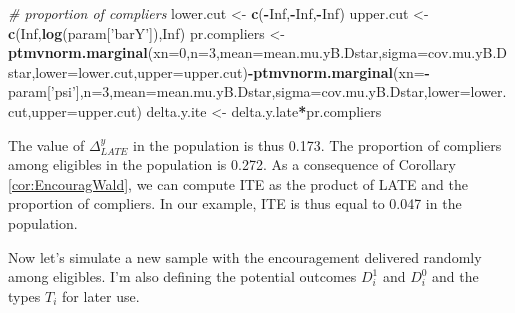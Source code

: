 \documentclass[]{book}
\newenvironment{Shaded}{\begin{snugshade}}{\end{snugshade}}
\newcommand{\CommentTok}[1]{\textcolor[rgb]{0.56,0.35,0.01}{\textit{#1}}}
\newcommand{\DataTypeTok}[1]{\textcolor[rgb]{0.13,0.29,0.53}{#1}}
\newcommand{\DecValTok}[1]{\textcolor[rgb]{0.00,0.00,0.81}{#1}}
\newcommand{\KeywordTok}[1]{\textcolor[rgb]{0.13,0.29,0.53}{\textbf{#1}}}
\newcommand{\NormalTok}[1]{#1}
\newcommand{\OperatorTok}[1]{\textcolor[rgb]{0.81,0.36,0.00}{\textbf{#1}}}
\newcommand{\OtherTok}[1]{\textcolor[rgb]{0.56,0.35,0.01}{#1}}
\newcommand{\StringTok}[1]{\textcolor[rgb]{0.31,0.60,0.02}{#1}}
\theoremstyle{definition}
\theoremstyle{definition}
\theoremstyle{definition}
\theoremstyle{remark}
\begin{document}
\begin{Shaded}
\begin{Highlighting}[]
\CommentTok{# proportion of compliers}
\NormalTok{lower.cut <-}\StringTok{ }\KeywordTok{c}\NormalTok{(}\OperatorTok{-}\OtherTok{Inf}\NormalTok{,}\OperatorTok{-}\OtherTok{Inf}\NormalTok{,}\OperatorTok{-}\OtherTok{Inf}\NormalTok{)}
\NormalTok{upper.cut <-}\StringTok{ }\KeywordTok{c}\NormalTok{(}\OtherTok{Inf}\NormalTok{,}\KeywordTok{log}\NormalTok{(param[}\StringTok{'barY'}\NormalTok{]),}\OtherTok{Inf}\NormalTok{)}
\NormalTok{pr.compliers <-}\StringTok{ }\KeywordTok{ptmvnorm.marginal}\NormalTok{(}\DataTypeTok{xn=}\DecValTok{0}\NormalTok{,}\DataTypeTok{n=}\DecValTok{3}\NormalTok{,}\DataTypeTok{mean=}\NormalTok{mean.mu.yB.Dstar,}\DataTypeTok{sigma=}\NormalTok{cov.mu.yB.Dstar,}\DataTypeTok{lower=}\NormalTok{lower.cut,}\DataTypeTok{upper=}\NormalTok{upper.cut)}\OperatorTok{-}\KeywordTok{ptmvnorm.marginal}\NormalTok{(}\DataTypeTok{xn=}\OperatorTok{-}\NormalTok{param[}\StringTok{'psi'}\NormalTok{],}\DataTypeTok{n=}\DecValTok{3}\NormalTok{,}\DataTypeTok{mean=}\NormalTok{mean.mu.yB.Dstar,}\DataTypeTok{sigma=}\NormalTok{cov.mu.yB.Dstar,}\DataTypeTok{lower=}\NormalTok{lower.cut,}\DataTypeTok{upper=}\NormalTok{upper.cut)}
\NormalTok{delta.y.ite <-}\StringTok{ }\NormalTok{delta.y.late}\OperatorTok{*}\NormalTok{pr.compliers}
\end{Highlighting}
\end{Shaded}

The value of \(\Delta^y_{LATE}\) in the population is thus 0.173.
The proportion of compliers among eligibles in the population is 0.272.
As a consequence of Corollary \ref{cor:EncouragWald}, we can compute ITE as the product of LATE and the proportion of compliers.
In our example, ITE is thus equal to 0.047 in the population.

Now let's simulate a new sample with the encouragement delivered randomly among eligibles.
I'm also defining the potential outcomes \(D^1_i\) and \(D^0_i\) and the types \(T_i\) for later use.
\end{document}
